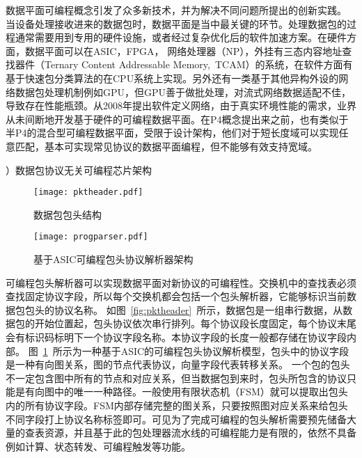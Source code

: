 数据平面可编程概念引发了众多新技术，并为解决不同问题所提出的创新实践。
当设备处理接收进来的数据包时，数据平面是当中最关键的环节。处理数据包的过程通常需要用到专用的硬件设施，或者经过复杂优化后的软件加速方案。在硬件方面，数据平面可以在ASIC，FPGA， 网络处理器（NP），外挂有三态内容地址查找器件（Ternary Content Addressable Memory,~TCAM）的系统，在软件方面有基于快速包分类算法的在CPU系统上实现。另外还有一类基于其他异构外设的网络数据包处理机制例如GPU，但GPU善于做批处理，对流式网络数据适配不佳，导致存在性能瓶颈。从2008年提出软件定义网络，由于真实环境性能的需求，业界从未间断地开发基于硬件的可编程数据平面。在P4概念提出来之前，也有类似于半P4的混合型可编程数据平面，受限于设计架构，他们对于短长度域可以实现任意匹配，基本可实现常见协议的数据平面编程，但不能够有效支持宽域。



{）数据包协议无关可编程芯片架构}




\begin{figure}[htbp]
	\centering 
	\vspace{-1.5mm}
	\begin{minipage}[t]{0.48\textwidth}
		\centering
		\texttt{[image: pktheader.pdf]}
		\caption{数据包包头结构} \label{fig:pktheader}
	\end{minipage}
	\begin{minipage}[t]{0.48\textwidth}
		\centering
		\texttt{[image: progparser.pdf]}
		\caption{基于ASIC可编程包头协议解析器架构} \label{fig:progparser}
	\end{minipage}
\end{figure}



可编程包头解析器可以实现数据平面对新协议的可编程性。交换机中的查找表必须查找固定协议字段，所以每个交换机都会包括一个包头解析器，它能够标识当前数据包包头的协议名称。
如图~\ref{fig:pktheader}~所示，数据包是一组串行数据，从数据包的开始位置起，包头协议依次串行排列。每个协议段长度固定，每个协议末尾会有标识码标明下一个协议字段名称。本协议字段的长度一般都存储在协议字段内部。
图~\ref{fig:progparser}~所示为一种基于ASIC的可编程包头协议解析模型，包头中的协议字段是一种有向图关系，图的节点代表协议，向量字段代表转移关系。
一个包的包头不一定包含图中所有的节点和对应关系，但当数据包到来时，包头所包含的协议只能是有向图中的唯一一种路径。一般使用有限状态机（FSM）就可以提取出包头内的所有协议字段。FSM内部存储完整的图关系，只要按照图对应关系来给包头不同字段打上协议名称标签即可。可见为了完成可编程的包头解析需要预先储备大量的查表资源，并且基于此的包处理器流水线的可编程能力是有限的，依然不具备例如计算、状态转发、可编程触发等功能。

